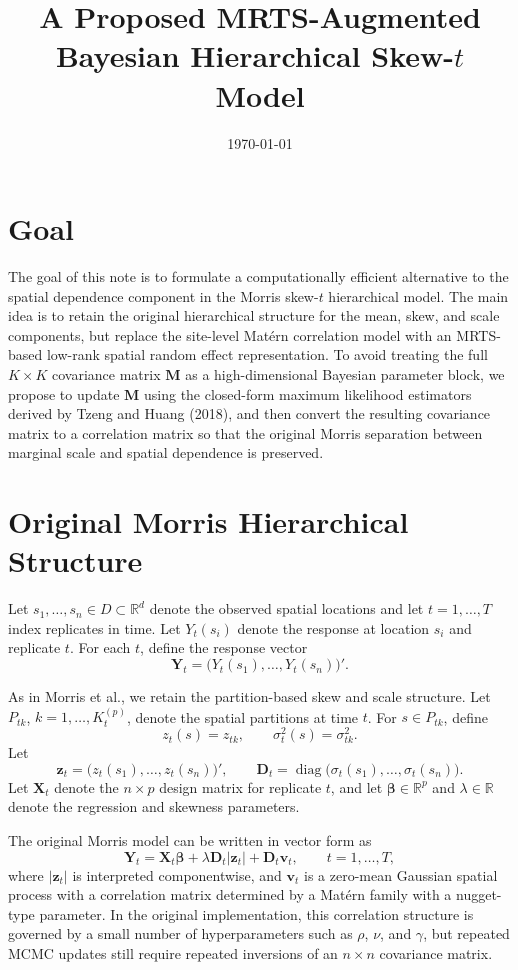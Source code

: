 \documentclass[11pt]{article}
\title{A Proposed MRTS-Augmented Bayesian Hierarchical Skew-$t$ Model}
\author{}
\date{\today}
\newcommand{\bY}{\mathbf{Y}}
\newcommand{\bX}{\mathbf{X}}
\newcommand{\bD}{\mathbf{D}}
\newcommand{\bM}{\mathbf{M}}
\newcommand{\bz}{\mathbf{z}}
\newcommand{\diag}{\operatorname{diag}}
\begin{document}
\maketitle

\section{Goal}

The goal of this note is to formulate a computationally efficient alternative to
the spatial dependence component in the Morris skew-$t$ hierarchical model. The
main idea is to retain the original hierarchical structure for the mean, skew,
and scale components, but replace the site-level Mat\'ern correlation model with
an MRTS-based low-rank spatial random effect representation. To avoid treating
the full $K \times K$ covariance matrix $\bM$ as a high-dimensional Bayesian
parameter block, we propose to update $\bM$ using the closed-form maximum
likelihood estimators derived by Tzeng and Huang (2018), and then convert the
resulting covariance matrix to a correlation matrix so that the original Morris
separation between marginal scale and spatial dependence is preserved.

\section{Original Morris Hierarchical Structure}

Let $s_1, \ldots, s_n \in D \subset \mathbb{R}^d$ denote the observed spatial
locations and let $t = 1, \ldots, T$ index replicates in time. Let
$Y_t(s_i)$ denote the response at location $s_i$ and replicate $t$. For each
$t$, define the response vector
\[
\bY_t = \bigl(Y_t(s_1), \ldots, Y_t(s_n)\bigr)'.
\]

As in Morris et al., we retain the partition-based skew and scale structure. Let
$P_{tk}$, $k = 1, \ldots, K_t^{(p)}$, denote the spatial partitions at time $t$.
For $s \in P_{tk}$, define
\[
z_t(s) = z_{tk},
\qquad
\sigma_t^2(s) = \sigma_{tk}^2.
\]
Let
\[
\bz_t = \bigl(z_t(s_1), \ldots, z_t(s_n)\bigr)',
\qquad
\bD_t = \diag\bigl(\sigma_t(s_1), \ldots, \sigma_t(s_n)\bigr).
\]
Let $\bX_t$ denote the $n \times p$ design matrix for replicate $t$, and let
$\bm{\beta} \in \mathbb{R}^p$ and $\lambda \in \mathbb{R}$ denote the regression
and skewness parameters.

The original Morris model can be written in vector form as
\begin{equation}
\bY_t = \bX_t \bm{\beta} + \lambda \bD_t |\bz_t| + \bD_t \mathbf{v}_t,
\qquad
t = 1, \ldots, T,
\label{eq:morris}
\end{equation}
where $|\bz_t|$ is interpreted componentwise, and $\mathbf{v}_t$ is a
zero-mean Gaussian spatial process with a correlation matrix determined by a
Mat\'ern family with a nugget-type parameter. In the original implementation,
this correlation structure is governed by a small number of hyperparameters
such as $\rho$, $\nu$, and $\gamma$, but repeated MCMC updates still require
repeated inversions of an $n \times n$ covariance matrix.
\end{document}
